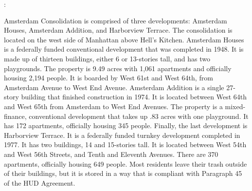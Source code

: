 : 

 

Amsterdam Consolidation is comprised of three developments: Amsterdam Houses, Amsterdam Addition, and Harborview Terrace. The consolidation is located on the west side of Manhattan above Hell's Kitchen. Amsterdam Houses is a federally funded conventional development that was completed in 1948. It is made up of thirteen buildings, either 6 or 13-stories tall, and has two playgrounds. The property is 9.49 acres with 1,061 apartments and officially housing 2,194 people. It is boarded by West 61st and West 64th, from Amsterdam Avenue to West End Avenue. Amsterdam Addition is a single 27-story building that finished construction in 1974. It is located between West 64th and West 65th from Amsterdam to West End Avenues. The property is a mixed-finance, conventional development that takes up .83 acres with one playground. It has 172 apartments, officially housing 345 people. Finally, the last development is Harborview Terrace. It is a federally funded turnkey development completed in 1977. It has two buildings, 14 and 15-stories tall. It is located between West 54th and West 56th Streets, and Tenth and Eleventh Avenues. There are 370 apartments, officially housing 649 people. Most residents leave their trash outside of their buildings, but it is stored in a way that is compliant with Paragraph 45 of the HUD Agreement.